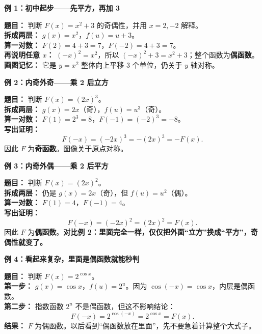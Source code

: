\clearpage
\begin{examplebox}
\textbf{\textcolor{CExample}{例 1：初中起步——先平方，再加 3}}


\textbf{题目：} 判断 $F(x)=x^2+3$ 的奇偶性，并用 $x=2,-2$ 解释。\\
\textbf{拆成两层：} $g(x)=x^2$，$f(u)=u+3$。\\
\textbf{算一对数：} $F(2)=4+3=7$，$F(-2)=4+3=7$。\\
\textbf{再说明任意 $x$：} $(-x)^2=x^2$，所以 $(-x)^2+3=x^2+3$；整个函数为\textbf{偶函数}。\\
\textbf{画图记忆：} 它是 $y=x^2$ 整体向上平移 3 个单位，仍关于 $y$ 轴对称。

\medskip

\end{examplebox}
\clearpage
\begin{examplebox}
\textbf{\textcolor{CExample}{例 2：内奇外奇——乘 2 后立方}}


\textbf{题目：} 判断 $F(x)=(2x)^3$。\\
\textbf{拆成两层：} $g(x)=2x$（奇），$f(u)=u^3$（奇）。\\
\textbf{算一对数：} $F(1)=2^3=8$，$F(-1)=(-2)^3=-8$。\\
\textbf{写出证明：}
\[
F(-x)=(-2x)^3=-(2x)^3=-F(x).
\]
因此 $F$ 为\textbf{奇函数}。图像关于原点对称。

\medskip

\end{examplebox}
\clearpage
\begin{examplebox}
\textbf{\textcolor{CExample}{例 3：内奇外偶——乘 2 后平方}}


\textbf{题目：} 判断 $F(x)=(2x)^2$。\\
\textbf{拆成两层：} 仍是 $g(x)=2x$（奇），但 $f(u)=u^2$（偶）。\\
\textbf{算一对数：} $F(1)=4$，$F(-1)=4$。\\
\textbf{写出证明：}
\[
F(-x)=(-2x)^2=(2x)^2=F(x).
\]
因此 $F$ 为\textbf{偶函数}。\textbf{对比例 2：里面完全一样，仅仅把外面“立方”换成“平方”，奇偶性就变了。}

\medskip

\end{examplebox}
\clearpage
\begin{examplebox}
\textbf{\textcolor{CExample}{例 4：看起来复杂，里面是偶函数就能秒判}}


\textbf{题目：} 判断 $F(x)=2^{\cos x}$。\\
\textbf{第一步：} $g(x)=\cos x$，$f(u)=2^u$。因为 $\cos(-x)=\cos x$，内层是偶函数。\\
\textbf{第二步：} 指数函数 $2^u$ 不是偶函数，但这不影响结论：
\[
F(-x)=2^{\cos(-x)}=2^{\cos x}=F(x).
\]
\textbf{结果：} $F$ 为偶函数。以后看到“偶函数放在里面”，先不要急着计算整个大式子。

\medskip

\end{examplebox}

